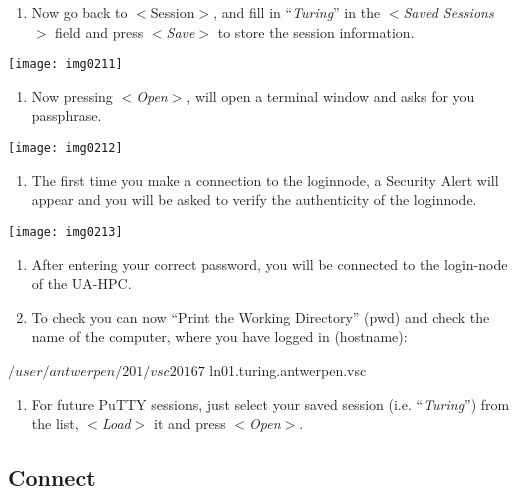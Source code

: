 \begin{enumerate}
\item  Now go back to $<$Session$>$, and fill in ``\textit{Turing}'' in the $<$\textit{Saved Sessions}$>$ field and press $<$\textit{Save}$>$ to store the session information.
\end{enumerate}

\texttt{[image: img0211]}

\begin{enumerate}
\item  Now pressing $<$\textit{Open}$>$, will open a terminal window and asks for you passphrase.
\end{enumerate}



\texttt{[image: img0212]}



\begin{enumerate}
\item  The first time you make a connection to the loginnode, a Security Alert will appear and you will be asked to verify the authenticity of the loginnode.
\end{enumerate}

\texttt{[image: img0213]}

\begin{enumerate}
\item  After entering your correct password, you will be connected to the login-node of the UA-HPC.
\item  To check you can now ``Print the Working Directory'' (pwd) and check the name of the computer, where you have logged in (hostname):
\end{enumerate}

\begin{prompt}
$ %
/user/antwerpen/201/vsc20167
$ %
ln01.turing.antwerpen.vsc
\end{prompt}

\begin{enumerate}
\item  For future PuTTY sessions, just select your saved session (i.e. ``\textit{Turing}'') from the list, $<$\textit{Load}$>$ it and press $<$\textit{Open}$>$.
\end{enumerate}


\subsection{Connect}



